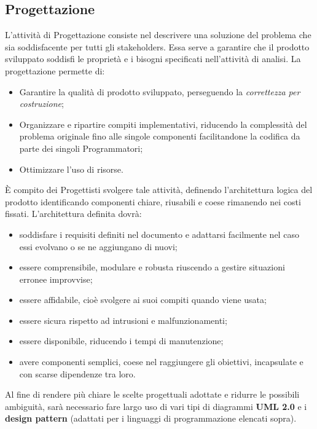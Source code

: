 \documentclass[NormeDiProgetto.tex]{subfiles}
\begin{document}





\subsection{Progettazione}
L’attività di Progettazione consiste nel descrivere una soluzione del problema
che sia soddisfacente per tutti gli stakeholders. Essa serve a garantire che
il prodotto sviluppato soddisfi le proprietà e i bisogni specificati nell’attività
di analisi. La progettazione permette di:
\begin{itemize}
	\item Garantire la qualità di prodotto sviluppato, perseguendo la \textit{correttezza
		per costruzione};
	\item Organizzare e ripartire compiti implementativi, riducendo la
	complessità del problema originale fino alle singole componenti
	facilitandone la codifica da parte dei singoli Programmatori;
	\item Ottimizzare l’uso di risorse.
\end{itemize}
\`{E} compito dei Progettisti svolgere tale attività, definendo l’architettura logica
del prodotto identificando componenti chiare, riusabili e coese rimanendo nei
costi fissati. L’architettura definita dovrà:
\begin{itemize}
	\item soddisfare i requisiti definiti nel documento \adr e adattarsi facilmente nel caso essi evolvano o se ne aggiungano di nuovi; 
	\item essere comprensibile, modulare e robusta riuscendo a gestire situazioni erronee improvvise;
	\item essere affidabile, cioè svolgere ai suoi compiti quando viene usata;
	\item essere sicura rispetto ad intrusioni e malfunzionamenti;
	\item essere disponibile, riducendo i tempi di manutenzione;
	\item avere componenti semplici, coese nel raggiungere gli obiettivi, incapsulate e con scarse dipendenze tra loro.
\end{itemize}
Al fine di rendere più chiare le scelte progettuali adottate e
ridurre le possibili ambiguità, sarà necessario fare largo uso di vari tipi di diagrammi 
\textbf{UML 2.0} e i \textbf{design pattern} (adattati per i linguaggi di programmazione elencati sopra).
\end{document}
